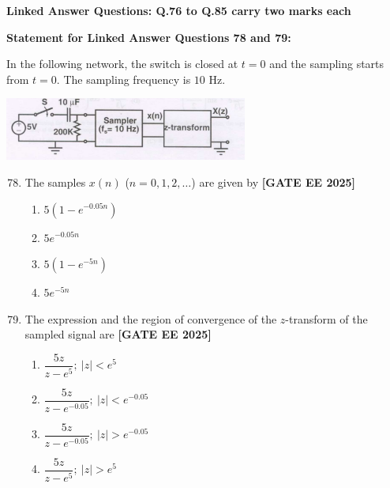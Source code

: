 \documentclass[12pt,a4paper]{article}
\begin{document}
\vspace{1em}
\item \textbf{Linked Answer Questions: Q.76 to Q.85 carry two marks each}
\item \textbf{Statement for Linked Answer Questions 78 and 79: }
\vspace{1em}
\newline
\item In the following network, the switch is closed at $t=0$ and the sampling starts from $t=0$. The sampling frequency is $10$ Hz.

\begin{center}
\includegraphics[width=0.6\textwidth]{figs/q7879.png}
\end{center}

\begin{enumerate}[leftmargin=*, label=\textbf{Q.\arabic*:}]
\setcounter{enumi}{77}

\item The samples $x(n)$ ($n=0,1,2,\ldots$) are given by
\newline
\noindent \textbf{[GATE EE 2025]}
\begin{enumerate}[label=(\Alph*)]
  \item $5 \left( 1 - e^{-0.05 n} \right)$
  \item $5 e^{-0.05 n}$
  \item $5 \left( 1 - e^{-5 n} \right)$
  \item $5 e^{-5 n}$
\end{enumerate}

\item The expression and the region of convergence of the $z$-transform of the sampled signal are
\newline
\noindent \textbf{[GATE EE 2025]}
\begin{enumerate}[label=(\Alph*)]
  \item $\dfrac{5z}{z-e^{5}};~ |z|<e^{5}$
  \item $\dfrac{5z}{z-e^{-0.05}};~ |z|<e^{-0.05}$
  \item $\dfrac{5z}{z-e^{-0.05}};~ |z|>e^{-0.05}$
  \item $\dfrac{5z}{z-e^{5}};~ |z|>e^{5}$
\end{enumerate}

\end{enumerate}
\end{document}
